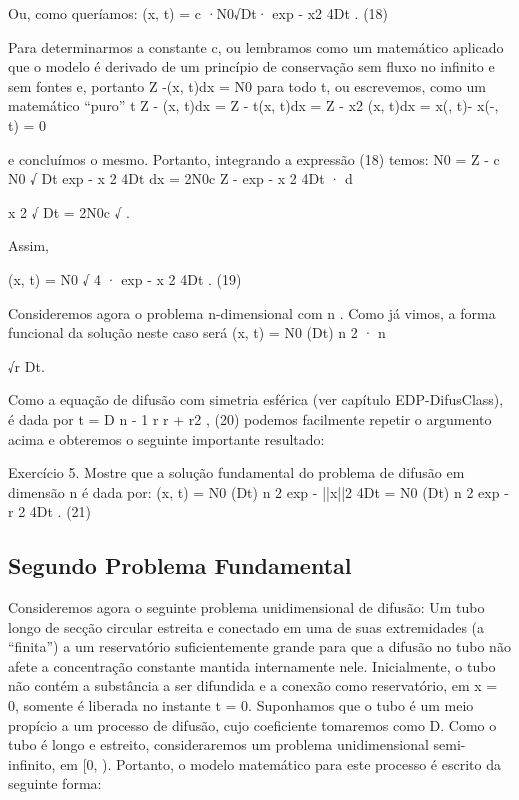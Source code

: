 Ou, como queríamos:
\rho (x, t) = c ·N0√Dt· exp 
-
x2
4Dt
. (18)

Para determinarmos a constante c, ou lembramos como um matemático aplicado que o modelo é derivado de um princípio de conservação sem fluxo no infinito e sem fontes e, portanto Z \infty 
-\infty \rho (x, t)dx = N0 para todo t, ou escrevemos, como um matemático “puro”
\partial 
\partial t Z \infty 
-\infty 
\rho (x, t)dx =
Z \infty 
-\infty 
\partial 
\partial t\rho (x, t)dx =
Z \infty 
-\infty 
{}
\partial x2
\rho (x, t)dx =
\partial \rho 
\partial x(\infty , t)-
\partial \rho 
\partial x(-\infty , t) = 0

e concluímos o mesmo. Portanto, integrando a expressão (18) temos:
N0 = Z \infty 
-\infty 
c
N0
√
Dt
exp 
-
x
2
4Dt
dx = 2N0c
Z \infty 
-\infty 
exp 
-
x
2
4Dt
· d

x
2
√
Dt
= 2N0c
√
\pi.

Assim,

\rho (x, t) = N0
√
4\piDt
· exp 
-
x
2
4Dt
. (19)

Consideremos agora o problema n-dimensional com n . Como já vimos, a forma funcional da solução neste caso será \rho (x, t) = N0
(Dt)
n
2
· \Phi n

√r
Dt.

Como a equação de difusão com simetria esférica (ver capítulo EDP-DifusClass), é dada por
\partial \rho 
\partial t = D
n - 1
r
\partial \rho 
\partial r +
\rho 
\partial r2
, (20)
podemos facilmente repetir o argumento acima e obteremos o seguinte importante resultado:

Exercício 5. Mostre que a solução fundamental do problema de difusão em dimensão n é dada por:
\rho (x, t) = N0
(Dt)
n
2
exp 
-
||x||2
4Dt 
=
N0
(Dt)
n
2
exp 
-
r
2
4Dt
. (21)


\subsection{Segundo Problema Fundamental}

Consideremos agora o seguinte problema unidimensional de difusão: Um tubo longo de secção circular estreita e conectado em uma de suas extremidades (a “finita”) a um reservatório suficientemente grande para que a difusão no tubo não afete a concentração constante  mantida internamente nele. Inicialmente, o tubo não contém a substância a ser difundida e a conexão como reservatório, em x = 0, somente é liberada no instante t = 0. Suponhamos que o tubo é um meio propício a um processo de difusão, cujo coeficiente tomaremos como D. Como o tubo é longo e estreito, consideraremos um problema unidimensional semi-infinito, em [0, \infty ). Portanto, o modelo matemático para este processo é escrito da seguinte forma:

